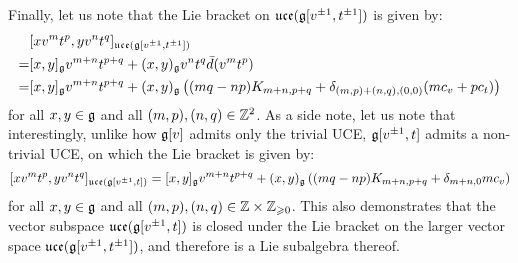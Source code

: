 \begin{example}
            Finally, let us note that the Lie bracket on $\mathfrak{uce}(\mathfrak{g}[v^{\pm 1}, t^{\pm 1}])$ is given by:
                $$
                    \begin{aligned}
                        & [x v^m t^p, y v^n t^q]_{\mathfrak{uce}(\mathfrak{g}[v^{\pm 1}, t^{\pm 1}])}
                        \\
                        = & [x, y]_{\mathfrak{g}} v^{m + n} t^{p + q} + (x, y)_{\mathfrak{g}} v^n t^q \bar{d}(v^m t^p)
                        \\
                        = & [x, y]_{\mathfrak{g}} v^{m + n} t^{p + q} + (x, y)_{\mathfrak{g}} \left( (mq - np) K_{m + n, p + q} + \delta_{(m, p) + (n, q), (0, 0)} ( m c_v + p c_t ) \right)
                    \end{aligned}
                $$
            for all $x, y \in \mathfrak{g}$ and all $(m, p), (n, q) \in \mathbb{Z}^2$. As a side note, let us note that interestingly, unlike how $\mathfrak{g}[v]$ admits only the trivial UCE, $\mathfrak{g}[v^{\pm 1}, t]$ admits a non-trivial UCE, on which the Lie bracket is given by:
                $$[x v^m t^p, y v^n t^q]_{\mathfrak{uce}(\mathfrak{g}[v^{\pm 1}, t])} = [x, y]_{\mathfrak{g}} v^{m + n} t^{p + q} + (x, y)_{\mathfrak{g}} \left( (mq - np) K_{m + n, p + q} + \delta_{m + n, 0} m c_v \right)$$
            for all $x, y \in \mathfrak{g}$ and all $(m, p), (n, q) \in \Z \x \Z_{\geq 0}$. This also demonstrates that the vector subspace $\mathfrak{uce}(\mathfrak{g}[v^{\pm 1}, t])$ is closed under the Lie bracket on the larger vector space $\mathfrak{uce}(\mathfrak{g}[v^{\pm 1}, t^{\pm 1}])$, and therefore is a Lie subalgebra thereof.
        \end{example}
